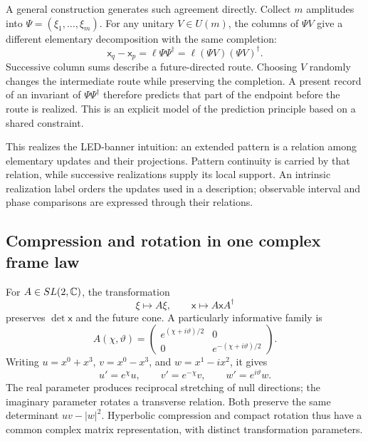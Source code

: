 A general construction generates such agreement directly. Collect \(m\) amplitudes into \(\Psi=(\xi_1,\ldots,\xi_m)\). For any unitary \(V\in U(m)\), the columns of \(\Psi V\) give a different elementary decomposition with the same completion:
\begin{equation}
\boxed{\mathsf x_q-\mathsf x_p=\ell\Psi\Psi^\dagger
=\ell(\Psi V)(\Psi V)^\dagger.}
\label{eq:completion}
\end{equation}
Successive column sums describe a future-directed route. Choosing \(V\) randomly changes the intermediate route while preserving the completion. A present record of an invariant of \(\Psi\Psi^\dagger\) therefore predicts that part of the endpoint before the route is realized. This is an explicit model of the prediction principle based on a shared constraint.

This realizes the LED-banner intuition: an extended pattern is a relation among elementary updates and their projections. Pattern continuity is carried by that relation, while successive realizations supply its local support. An intrinsic realization label orders the updates used in a description; observable interval and phase comparisons are expressed through their relations.

\subsection{Compression and rotation in one complex frame law}
For \(A\in SL(2,\mathbb C)\), the transformation
\begin{equation*}
\xi\mapsto A\xi,\qquad
\mathsf x\mapsto A\mathsf xA^\dagger
\end{equation*}
preserves \(\det\mathsf x\) and the future cone. A particularly informative family is
\begin{equation}
A(\chi,\vartheta)=
\begin{pmatrix}
e^{(\chi+i\vartheta)/2}&0\\
0&e^{-(\chi+i\vartheta)/2}
\end{pmatrix}.
\label{eq:complexframe}
\end{equation}
Writing \(u=x^0+x^3\), \(v=x^0-x^3\), and \(w=x^1-ix^2\), it gives
\begin{equation}
u'=e^\chi u,\qquad v'=e^{-\chi}v,
\qquad w'=e^{i\vartheta}w.
\label{eq:uv}
\end{equation}
The real parameter produces reciprocal stretching of null directions; the imaginary parameter rotates a transverse relation. Both preserve the same determinant \(uv-|w|^2\). Hyperbolic compression and compact rotation thus have a common complex matrix representation, with distinct transformation parameters.

